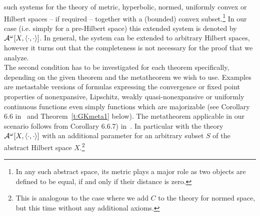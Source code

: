 such systems for the theory of metric, hyperbolic, normed, uniformly convex or Hilbert spaces -- 
if required -- together with a (bounded) convex subset.\footnote{In any such abstract space,
its metric plays a major role as two objects are defined to be equal, if and only if their 
distance is zero.} In our case (i.e. simply for a pre-Hilbert space) this extended system is denoted by $\mathcal{A}^\omega[X,\langle\cdot,\cdot\rangle]$.
In general, the system can be extended to arbitrary Hilbert spaces, however it turns out that the completeness
is not necessary for the proof that we analyze.\\
The second condition has to be investigated for each theorem specifically, depending on
the given theorem and the metatheorem we wish to use. Examples are metastable versions of formulas 
expressing the convergence or fixed point properties
of nonexpansive, Lipschitz, weakly quasi-nonexpansive or uniformly continuous functions even simply functions 
which are majorizable (see Corollary 6.6 in~\cite{GK08} and Theorem~\ref{t:GKmeta1} below).
The metatheorem applicable
in our scenario follows from Corollary 6.6.7) in~\cite{GK08}. In particular with 
the theory $\mathcal{A}^\omega[X,\langle\cdot,\cdot\rangle]$ with an additional parameter for an arbitrary subset $S$ of the
abstract Hilbert space $X$.\footnote{This is analogous to the case where we add $C$ to the
theory for normed space, but this time without any additional axioms.}\\

